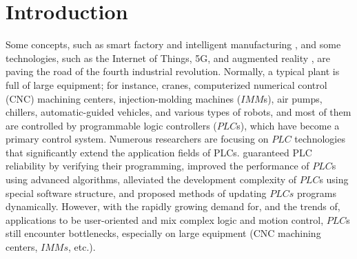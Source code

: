 \documentclass[journal,UTF8]{IEEEtran}
\begin{document}
%
\IEEEpeerreviewmaketitle



\section{Introduction}
Some concepts, such as smart factory and intelligent manufacturing \cite{Gonzalez2017Supervisory,Chekired2018Industrial}, and some technologies, such as the Internet of Things, 5G, and augmented reality \cite{Li2018Energy,Ling20185G}, are paving the road of the fourth industrial revolution. Normally, a typical plant is full of large equipment; for instance, cranes, computerized numerical control (CNC) machining centers, injection-molding machines ($IMM$s), air pumps, chillers, automatic-guided vehicles, and various types of robots, and most of them are controlled by programmable logic controllers ($PLC$s), which have become a primary control system. Numerous researchers are focusing on $PLC$ technologies that significantly extend the application fields of PLCs. \cite{Jiang2013System,Jiang2013Bayesian,Adiego2015Applying} guaranteed PLC reliability by verifying their programming, \cite{Gerk2006Advanced,Chang2007Adaptive,Dominic2016PLC} improved the performance of $PLC$s using advanced algorithms, \cite{WuA} alleviated the development complexity of $PLC$s using special software structure, and \cite{Sch2013Development,Morenas2017Shop} proposed methods of updating $PLCs$ programs dynamically.
% 
% 
However, with the rapidly growing demand for, and the trends of, applications to be user-oriented and mix complex logic and motion control\cite{Zaeh2005A,Hossain2014Advanced}, $PLC$s still encounter bottlenecks, especially on large equipment (CNC machining centers, $IMMs$, etc.).
\end{document}
